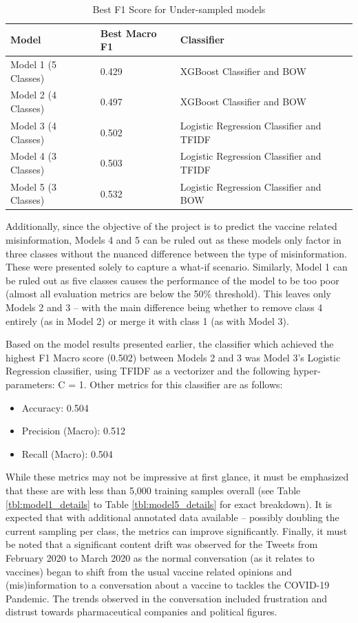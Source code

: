 \documentclass[12pt]{article}
\begin{document}
\begin{table}[tbp]
\centering
\begin{tabularx}{\linewidth}{ l l X}
\toprule
   Model & Best Macro F1 & Classifier \\
\midrule

Model 1 (5 Classes) & 0.429 & XGBoost Classifier and BOW \\
Model 2 (4 Classes) & 0.497 & XGBoost Classifier and BOW \\
Model 3 (4 Classes) & 0.502 & Logistic Regression Classifier and TFIDF \\
Model 4 (3 Classes) & 0.503 & Logistic Regression Classifier and TFIDF \\ 
Model 5 (3 Classes) & 0.532 & Logistic Regression Classifier and BOW\\

\bottomrule
\end{tabularx}
\caption{Best F1 Score for Under-sampled models}
\label{tbl:best_f1_us}
\end{table}

Additionally, since the objective of the project is to predict the vaccine related misinformation, Models 4 and 5 can be ruled out as these models only factor in three classes without the nuanced difference between the type of misinformation. These were presented solely to capture a what-if scenario. Similarly, Model 1 can be ruled out as five classes causes the performance of the model to be too poor (almost all evaluation metrics are below the 50\% threshold). This leaves only Models 2 and 3 – with the main difference being whether to remove class 4 entirely (as in Model 2) or merge it with class 1 (as with Model 3). 

Based on the model results presented earlier, the classifier which achieved the highest F1 Macro score (0.502) between Models 2 and 3 was Model 3’s Logistic Regression classifier, using TFIDF as a vectorizer and the following hyper-parameters: C = 1. 
Other metrics for this classifier are as follows:

\begin{itemize}
\item Accuracy: 0.504
\item Precision (Macro): 0.512
\item Recall (Macro): 0.504
\end {itemize}

While these metrics may not be impressive at first glance, it must be emphasized that these are with less than 5,000 training samples overall (see Table \ref{tbl:model1_details}  to Table \ref{tbl:model5_details} for exact breakdown). It is expected that with additional annotated data available – possibly doubling the current sampling per class, the metrics can improve significantly.
Finally, it must be noted that a significant content drift was observed for the Tweets from February 2020 to March 2020 as the normal conversation (as it relates to vaccines) began to shift from the usual vaccine related opinions and (mis)information to a conversation about a vaccine to tackles the COVID-19 Pandemic. The trends observed in the conversation included frustration and distrust towards pharmaceutical companies and political figures.  
\end{document}
